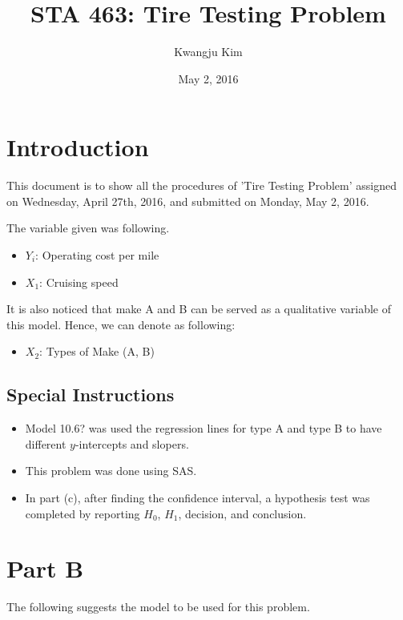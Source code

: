 \documentclass[letterpaper]{article}
\title{STA 463: Tire Testing Problem}
\author{Kwangju Kim}
\date{May 2, 2016}
\begin{document}
\maketitle

\section{Introduction}
\begin{flushleft}
This document is to show all the procedures of 'Tire Testing Problem' assigned on Wednesday, April 27th, 2016, and submitted on Monday, May 2, 2016.
\end{flushleft}

\begin{flushleft}
The variable given was following.
\end{flushleft}

\begin{itemize}
\item $Y_i$: Operating cost per mile
\item $X_1$: Cruising speed
\end{itemize}

\begin{flushleft}
It is also noticed that make A and B can be served as a qualitative variable of this model. Hence, we can denote as following:
\end{flushleft}

\begin{itemize}
\item $X_2$: Types of Make (A, B)
\end{itemize}

\subsection{Special Instructions}
\begin{itemize}
\item Model 10.6? was used the regression lines for type A and type B to have different $y$-intercepts and slopers.
\item This problem was done using SAS.
\item In part (c), after finding the confidence interval, a hypothesis test was completed by reporting $H_0$, $H_1$, decision, and conclusion.
\end{itemize}

\section{Part B}
\begin{flushleft}
The following suggests the model to be used for this problem.
\end{flushleft}
\end{document}
